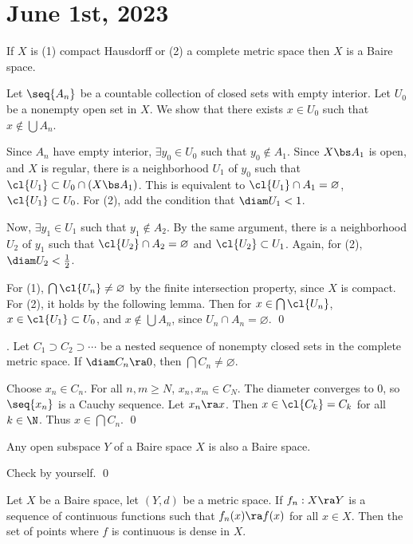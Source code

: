 \section*{June 1st, 2023}

  If \(X\) is (1) compact Hausdorff or (2) a complete metric space then \(X\) is a Baire space.

\pf Let \(\seq{A_n}\) be a countable collection of closed sets with empty interior. Let \(U_0\) be a nonempty open set in \(X\). We show that there exists \(x \in U_0\) such that \(x \notin \bigcup A_n\).

Since \(A_n\) have empty interior, \(\exists y_0 \in U_0\) such that \(y_0 \notin A_1\). Since \(X \bs A_1\) is open, and \(X\) is regular, there is a neighborhood \(U_1\) of \(y_0\) such that \(\cl{U_1} \subset U_0 \cap (X \bs A_1)\). This is equivalent to \(\cl{U_1} \cap A_1 = \varnothing\), \(\cl{U_1} \subset U_0\). For (2), add the condition that \(\diam U_1 < 1\).

Now, \(\exists y_1 \in U_1\) such that \(y_1 \notin A_2\). By the same argument, there is a neighborhood \(U_2\) of \(y_1\) such that \(\cl{U_2} \cap A_2 = \varnothing\) and \(\cl{U_2} \subset U_1\). Again, for (2), \(\diam U_2 < \frac{1}{2}\).

For (1), \(\bigcap \cl{U_n} \neq \varnothing\) by the finite intersection property, since \(X\) is compact. For (2), it holds by the following lemma. Then for \(x \in \bigcap \cl{U_n}\), \(x \in \cl{U_1} \subset U_0\), and \(x \notin \bigcup A_n\), since \(U_n \cap A_n = \varnothing\). \qed

\lemma. Let \(C_1 \supset C_2 \supset \cdots\) be a nested sequence of nonempty closed sets in the complete metric space. If \(\diam C_n \ra 0\), then \(\bigcap C_n \neq \varnothing\).

\pf Choose \(x_n \in C_n\). For all \(n, m \geq N\), \(x_n, x_m \in C_N\). The diameter converges to 0, so \(\seq{x_n}\) is a Cauchy sequence. Let \(x_n \ra x\). Then \(x \in \cl{C_k} = C_k\) for all \(k \in \N\). Thus \(x \in \bigcap C_n\). \qed

 Any open subspace \(Y\) of a Baire space \(X\) is also a Baire space.

\pf Check by yourself. \qed

 Let \(X\) be a Baire space, let \((Y, d)\) be a metric space. If \(f_n : X \ra Y\) is a sequence of continuous functions such that \(f_n(x) \ra f(x)\) for all \(x \in X\). Then the set of points where \(f\) is continuous is dense in \(X\).

